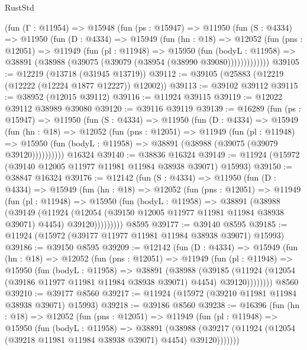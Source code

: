 \begin{lexlean}{RustStd}
\begin{coremodule}
{\begin{coremodule}
{{{{{{{{{{{{{{{{{{{{{{{{{{{{{{{{{{{{{{{{{{{{{{{{{{{{{{{{{{{{{{{{{{{{{{{{{{{{{{{{    (fun (Γ : @11954) =>
    @15948
      (fun (ps : @15947) =>
      @11950
        (fun (S : @4334) =>
        @11950
          (fun (D : @4334) =>
          @15949
            (fun (hn : @18) =>
            @12052
              (fun (pns : @12051) =>
              @11949
                (fun (pl : @11948) =>
                @15950
                  (fun (bodyL : @11958) =>
                  @38891 (@38988 (@39075 (@39079 (@38954 (@38990 @39080)))))))))))))
@39105 := @12219 (@13718 (@31945 @13719))
@39112 := @39105 (@25883 (@12219 (@12222 (@12224 @1877 @12227)) @12002))
@39113 := @39102 @39112
@39115 := @38952 (@12015 @39112)
@39116 := @11924 @39115
@39119 := @12022 @39112 @38989 @39080
@39120 := @39116 @39119
@39139 := @16289
    (fun (ps : @15947) =>
    @11950
      (fun (S : @4334) =>
      @11950
        (fun (D : @4334) =>
        @15949
          (fun (hn : @18) =>
          @12052
            (fun (pns : @12051) =>
            @11949
              (fun (pl : @11948) =>
              @15950 (fun (bodyL : @11958) => @38891 (@38988 (@39075 (@39079 @39120))))))))))
    @16324
@39140 := @38836 @16324
@39149 := @11924 (@15972 (@39140 @12005 @11977 @11981 @11984 @38938 @39071) @15993)
@39150 := @38847 @16324
@39176 := @12142
    (fun (S : @4334) =>
    @11950
      (fun (D : @4334) =>
      @15949
        (fun (hn : @18) =>
        @12052
          (fun (pns : @12051) =>
          @11949
            (fun (pl : @11948) =>
            @15950
              (fun (bodyL : @11958) =>
              @38891
                (@38988
                  (@39149
                    (@11924
                      (@12054 (@39150 @12005 @11977 @11981 @11984 @38938 @39071) @4454)
                      @39120)))))))))
    @8595
@39177 := @39140 @8595
@39185 := @11924 (@15972 (@39177 @11977 @11981 @11984 @38938 @39071) @15993)
@39186 := @39150 @8595
@39209 := @12142
    (fun (D : @4334) =>
    @15949
      (fun (hn : @18) =>
      @12052
        (fun (pns : @12051) =>
        @11949
          (fun (pl : @11948) =>
          @15950
            (fun (bodyL : @11958) =>
            @38891
              (@38988
                (@39185
                  (@11924 (@12054 (@39186 @11977 @11981 @11984 @38938 @39071) @4454) @39120))))))))
    @8560
@39210 := @39177 @8560
@39217 := @11924 (@15972 (@39210 @11981 @11984 @38938 @39071) @15993)
@39218 := @39186 @8560
@39238 := @16396
    (fun (hn : @18) =>
    @12052
      (fun (pns : @12051) =>
      @11949
        (fun (pl : @11948) =>
        @15950
          (fun (bodyL : @11958) =>
          @38891
            (@38988
              (@39217 (@11924 (@12054 (@39218 @11981 @11984 @38938 @39071) @4454) @39120)))))))
}}}}}}}}}}}}}}}}}}}}}}}}}}}}}}}}}}}}}}}}}}}}}}}}}}}}}}}}}}}}}}}}}}}}}}}}}}}}}}}}
\end{coremodule}}
\end{coremodule}
\end{lexlean}
